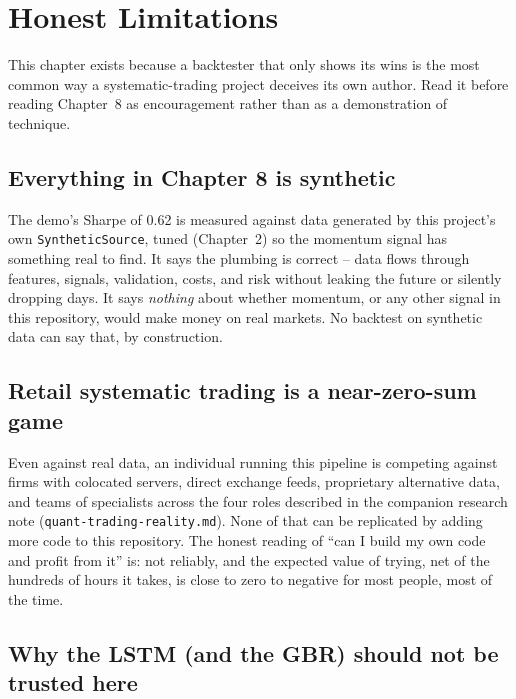 \chapter{Honest Limitations}

This chapter exists because a backtester that only shows its wins is the most
common way a systematic-trading project deceives its own author. Read it before
reading Chapter~8 as encouragement rather than as a demonstration of technique.

\section{Everything in Chapter 8 is synthetic}

The demo's Sharpe of 0.62 is measured against data generated by this project's
own \texttt{SyntheticSource}, tuned (Chapter~2) so the momentum signal has
something real to find. It says the plumbing is correct -- data flows through
features, signals, validation, costs, and risk without leaking the future or
silently dropping days. It says \emph{nothing} about whether momentum, or any
other signal in this repository, would make money on real markets. No backtest
on synthetic data can say that, by construction.

\section{Retail systematic trading is a near-zero-sum game}

Even against real data, an individual running this pipeline is competing
against firms with colocated servers, direct exchange feeds, proprietary
alternative data, and teams of specialists across the four roles described in
the companion research note (\texttt{quant-trading-reality.md}). None of that
can be replicated by adding more code to this repository. The honest reading
of ``can I build my own code and profit from it'' is: not reliably, and the
expected value of trying, net of the hundreds of hours it takes, is close to
zero to negative for most people, most of the time.

\section{Why the LSTM (and the GBR) should not be trusted here}

